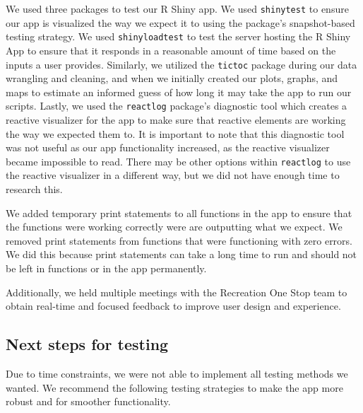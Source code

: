 \documentclass[
  11 pt,
  openany]{book}
\begin{document}
We used three packages to test our R Shiny app. We used \texttt{shinytest} \citep{R-shinytest} to ensure our app is visualized the way we expect it to using the package's snapshot-based testing strategy. We used \texttt{shinyloadtest} \citep{R-shinyloadtest} to test the server hosting the R Shiny App to ensure that it responds in a reasonable amount of time based on the inputs a user provides. Similarly, we utilized the \texttt{tictoc} \citep{R-tictoc} package during our data wrangling and cleaning, and when we initially created our plots, graphs, and maps to estimate an informed guess of how long it may take the app to run our scripts. Lastly, we used the \texttt{reactlog} \citep{R-reactlog} package's diagnostic tool which creates a reactive visualizer for the app to make sure that reactive elements are working the way we expected them to. It is important to note that this diagnostic tool was not useful as our app functionality increased, as the reactive visualizer became impossible to read. There may be other options within \texttt{reactlog} to use the reactive visualizer in a different way, but we did not have enough time to research this.

We added temporary print statements to all functions in the app to ensure that the functions were working correctly were are outputting what we expect. We removed print statements from functions that were functioning with zero errors. We did this because print statements can take a long time to run and should not be left in functions or in the app permanently.

Additionally, we held multiple meetings with the Recreation One Stop team to obtain real-time and focused feedback to improve user design and experience.

\hypertarget{next-steps-for-testing}{%
\subsection{Next steps for testing}\label{next-steps-for-testing}}

Due to time constraints, we were not able to implement all testing methods we wanted. We recommend the following testing strategies to make the app more robust and for smoother functionality.
\end{document}

